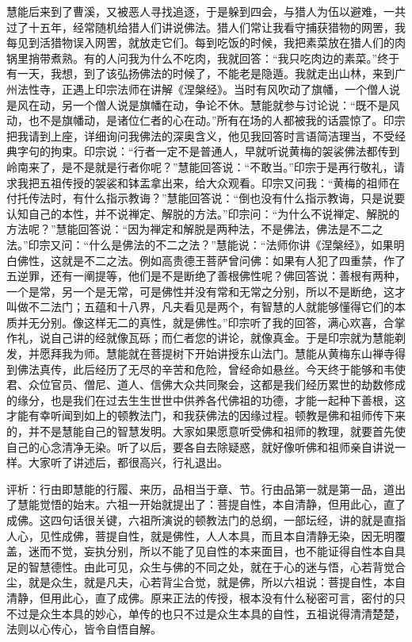 \documentclass[12pt,twoside,openany]{book}
\newcommand{\kai}[1]{{\CJKfamily{kai}#1}}
\begin{document}
\kai{慧能后来到了曹溪，又被恶人寻找追逐，于是躲到四会，与猎人为伍以避难，一共过了十五年，经常随机给猎人们讲说佛法。猎人们常让我看守捕获猎物的网罟，我每见到活猎物误入网罟，就放走它们。每到吃饭的时候，我把素菜放在猎人们的肉锅里捎带煮熟。有的人问我为什么不吃肉，我就回答：“我只吃肉边的素菜。”终于有一天，我想，到了该弘扬佛法的时候了，不能老是隐遁。我就走出山林，来到广州法性寺，正遇上印宗法师在讲解《涅槃经》。当时有风吹动了旗幡，一个僧人说是风在动，另一个僧人说是旗幡在动，争论不休。慧能就参与讨论说：“既不是风动，也不是旗幡动，是诸位仁者的心在动。”所有在场的人都被我的话震惊了。印宗把我请到上座，详细询问我佛法的深奥含义，他见我回答时言语简洁理当，不受经典字句的拘束。印宗说：“行者一定不是普通人，早就听说黄梅的袈裟佛法都传到岭南来了，是不是就是行者你呢？”慧能回答说：“不敢当。”印宗于是再行敬礼，请求我把五祖传授的袈裟和钵盂拿出来，给大众观看。印宗又问我：“黄梅的祖师在付托传法时，有什么指示教诲？”慧能回答说：“倒也没有什么指示教诲，只是说要认知自己的本性，并不说禅定、解脱的方法。”印宗问：“为什么不说禅定、解脱的方法呢？”慧能回答说：“因为禅定和解脱是两种法，不是佛法，佛法是不二之法。”印宗又问：“什么是佛法的不二之法？”慧能说：“法师你讲《涅槃经》，如果明白佛性，这就是不二之法。例如高贵德王菩萨曾问佛：如果有人犯了四重禁，作了五逆罪，还有一阐提等，他们是不是断绝了善根佛性呢？佛回答说：善根有两种，一个是常，另一个是无常，可是佛性并没有常和无常之分别，所以不是断绝，这才叫做不二法门；五蕴和十八界，凡夫看见是两个，有智慧的人就能够懂得它们的本质并无分别。像这样无二的真性，就是佛性。”印宗听了我的回答，满心欢喜，合掌作礼，说自己讲的经就像瓦砾；而仁者您的讲论，就像真金。于是印宗就为慧能剃发，并愿拜我为师。慧能就在菩提树下开始讲授东山法门。慧能从黄梅东山禅寺得到佛法真传，此后经历了无尽的辛苦和危险，曾经命如悬丝。今天终于能够和韦使君、众位官员、僧尼、道人、信佛大众共同聚会，这都是我们经历累世的劫数修成的缘分，也是我们在过去生生世世中供养各代佛祖的功德，才能一起种下善根，这才能有幸听闻到如上的顿教法门，和我获佛法的因缘过程。顿教是佛和祖师传下来的，并不是慧能自己的智慧发明。大家如果愿意听受佛和祖师的教理，就要首先使自己的心念清净无染。听了以后，要各自去除疑惑，就好像听佛和祖师亲自讲说一样。大家听了讲述后，都很高兴，行礼退出。}

\kai{评析：行由即慧能的行履、来历，品相当于章、节。行由品第一就是第一品，道出了慧能觉悟的始末。六祖一开始就提出了：菩提自性，本自清静，但用此心，直了成佛。这四句话很关键，六祖所演说的顿教法门的总纲，一部坛经，讲的就是直指人心，见性成佛，菩提自性，就是佛性，人人本具，而且本自清静无染，因无明覆盖，迷而不觉，妄执分别，所以不能了见自性的本来面目，也不能证得自性本自具足的智慧德性。由此可见，众生与佛的不同之处，就在于心的迷与悟，心若背觉合尘，就是众生，就是凡夫，心若背尘合觉，就是佛，所以六祖说：菩提自性，本自清静，但用此心，直了成佛。原来正法的传授，根本没有什么秘密可言，密付的只不过是众生本具的妙心，单传的也只不过是众生本具的自性，五祖说得清清楚楚，法则以心传心，皆令自悟自解。}
\end{document}
